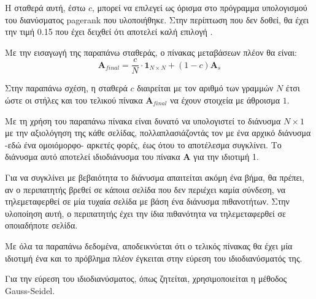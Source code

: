 Η σταθερά αυτή, έστω $c$, μπορεί να επιλεγεί ως όρισμα στο πρόγραμμα υπολογισμού του διανύσματος pagerank που υλοποιήθηκε. Στην περίπτωση που δεν δοθεί, θα έχει την τιμή 0.15 που έχει δειχθεί ότι αποτελεί καλή επιλογή \parencite{brin1998anatomy}.

Με την εισαγωγή της παραπάνω σταθεράς, ο πίνακας μεταβάσεων πλέον θα είναι:
\[
  \bm{A}_{final} = \frac{c}{N}\cdot\bm{1}_{N\times N}+(1-c)\bm{A}_s
\]

Στην παραπάνω σχέση, η σταθερά $c$ διαιρείται με τον αριθμό των γραμμών $N$ έτσι ώστε οι στήλες και του τελικού πίνακα $\bm{A}_{final}$ να έχουν στοιχεία με άθροισμα $1$.

Με τη χρήση του παραπάνω πίνακα είναι δυνατό να υπολογιστεί το διάνυσμα $N\times1$ με την αξιολόγηση της κάθε σελίδας, πολλαπλασιάζοντάς τον με ένα αρχικό διάνυσμα -εδώ ένα ομοιόμορφο- αρκετές φορές, έως ότου το αποτέλεσμα συγκλίνει. Το διάνυσμα αυτό αποτελεί ιδιοδιάνυσμα του πίνακα $\bm{A}$ για την ιδιοτιμή 1.

Για να συγκλίνει με βεβαιότητα το διάνυσμα απαιτείται ακόμη ένα βήμα, θα πρέπει, αν ο περιπατητής βρεθεί σε κάποια σελίδα που δεν περιέχει καμία σύνδεση, να τηλεμεταφερθεί σε μία τυχαία σελίδα με βάση ένα διάνυσμα πιθανοτήτων. Στην υλοποίηση αυτή, ο περιπατητής έχει την ίδια πιθανότητα να τηλεμεταφερθεί σε οποιαδήποτε σελίδα.

Με όλα τα παραπάνω δεδομένα, αποδεικνύεται ότι ο τελικός πίνακας θα έχει μία ιδιοτιμή ένα και το πρόβλημα πλέον έγκειται στην εύρεση του ιδιοδιανύσματός της.

Για την εύρεση του ιδιοδιανύσματος, όπως ζητείται, χρησιμοποιείται η μέθοδος Gauss-Seidel.

